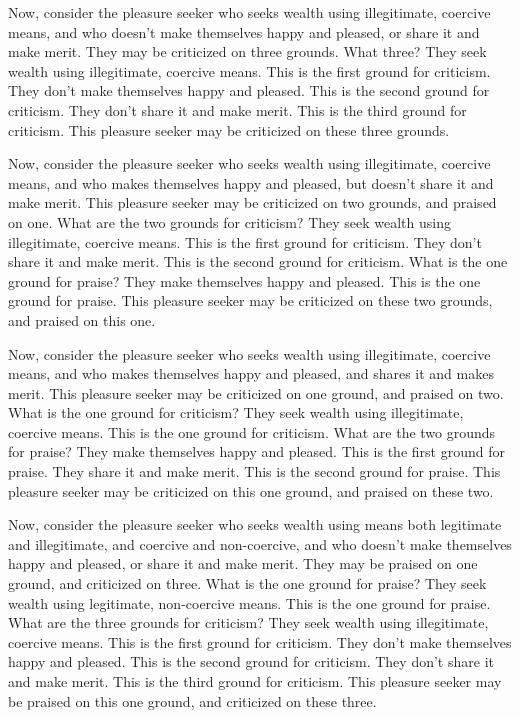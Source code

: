 \documentclass[12pt,openany]{book}%
\begin{document}
Now, consider the pleasure seeker who seeks wealth using illegitimate, coercive means, and who doesn’t make themselves happy and pleased, or share it and make merit. They may be criticized on three grounds. What three? They seek wealth using illegitimate, coercive means. This is the first ground for criticism. They don’t make themselves happy and pleased. This is the second ground for criticism. They don’t share it and make merit. This is the third ground for criticism. This pleasure seeker may be criticized on these three grounds. 

Now, consider the pleasure seeker who seeks wealth using illegitimate, coercive means, and who makes themselves happy and pleased, but doesn’t share it and make merit. This pleasure seeker may be criticized on two grounds, and praised on one. What are the two grounds for criticism? They seek wealth using illegitimate, coercive means. This is the first ground for criticism. They don’t share it and make merit. This is the second ground for criticism. What is the one ground for praise? They make themselves happy and pleased. This is the one ground for praise. This pleasure seeker may be criticized on these two grounds, and praised on this one. 

Now, consider the pleasure seeker who seeks wealth using illegitimate, coercive means, and who makes themselves happy and pleased, and shares it and makes merit. This pleasure seeker may be criticized on one ground, and praised on two. What is the one ground for criticism? They seek wealth using illegitimate, coercive means. This is the one ground for criticism. What are the two grounds for praise? They make themselves happy and pleased. This is the first ground for praise. They share it and make merit. This is the second ground for praise. This pleasure seeker may be criticized on this one ground, and praised on these two. 

Now, consider the pleasure seeker who seeks wealth using means both legitimate and illegitimate, and coercive and non-coercive, and who doesn’t make themselves happy and pleased, or share it and make merit. They may be praised on one ground, and criticized on three. What is the one ground for praise? They seek wealth using legitimate, non-coercive means. This is the one ground for praise. What are the three grounds for criticism? They seek wealth using illegitimate, coercive means. This is the first ground for criticism. They don’t make themselves happy and pleased. This is the second ground for criticism. They don’t share it and make merit. This is the third ground for criticism. This pleasure seeker may be praised on this one ground, and criticized on these three. 
\end{document}
